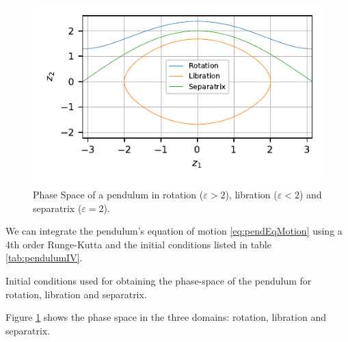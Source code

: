 \begin{figure}[h]
    \centering
    \includegraphics{CodeAndFigures/PendulumPhaseSpace.pdf}
    \caption{Phase Space of a pendulum in rotation ($\varepsilon>2$), libration ($\varepsilon<2$) and separatrix ($\varepsilon=2$).}
    \label{fig:pendPhaseSpace}
\end{figure}

We can integrate the pendulum's equation of motion \ref{eq:pendEqMotion} using a 4th order Runge-Kutta and the initial conditions listed in table \ref{tab:pendulumIV}.

\begin{table}[h]
    \centering
    
    \caption{Initial conditions used for obtaining the phase-space of the pendulum for rotation, libration and separatrix.}
    \label{tab:pendulumIV}
\end{table}

Figure \ref{fig:pendPhaseSpace} shows the phase space in the three domains: rotation, libration and separatrix.

